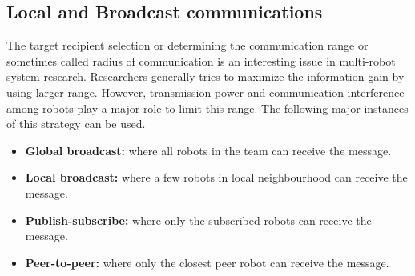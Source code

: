 \documentclass{intech}
\begin{document}
\subsection*{Local and Broadcast communications}
The target recipient selection or determining the communication range or sometimes called radius of communication is an interesting issue in multi-robot system research. Researchers generally tries to maximize the information gain by using larger range. However, transmission power and communication interference among robots play a major role to limit this range. The following major instances of this strategy can be used.
\begin{itemize}
\item \textbf{Global broadcast:} where all robots in the team can receive the message.
\item \textbf{Local broadcast:} where a few robots in local neighbourhood can receive the message.
\item \textbf{Publish-subscribe:} where only the  subscribed robots can receive the message.
\item \textbf{Peer-to-peer:} where only the closest peer robot can receive the message.
\end{itemize}
\end{document}
